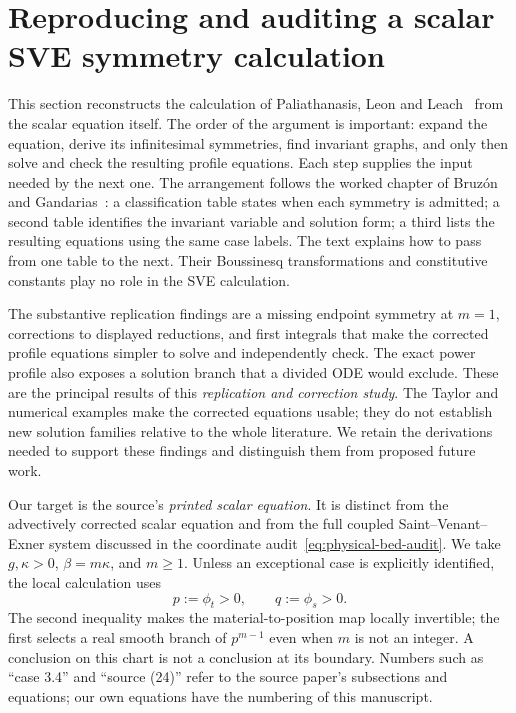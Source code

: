 \documentclass[11pt]{article}
\theoremstyle{definition}
\begin{document}
\section{Reproducing and auditing a scalar SVE symmetry calculation}
\label{sec:sve-repro}
This section reconstructs the calculation of Paliathanasis, Leon and
Leach~\cite{ap} from the scalar equation itself. The order of the argument is
important: expand the equation, derive its infinitesimal symmetries, find
invariant graphs, and only then solve and check the resulting profile
equations. Each step supplies the input needed by the next one. The
arrangement follows the worked chapter of Bruz\'{o}n and
Gandarias~\cite[Sec.~2, Tables~1--3, pp.~157--159]{bruzon-gandarias-2021}:
a classification table states when each symmetry is admitted; a second
table identifies the invariant variable and solution form; a third lists
the resulting equations using the same case labels. The text explains how
to pass from one table to the next. Their Boussinesq transformations and
constitutive constants play no role in the SVE calculation.

The substantive replication findings are a missing endpoint symmetry at
$m=1$, corrections to displayed reductions, and first integrals that make
the corrected profile equations simpler to solve and independently check.
The exact power profile also exposes a solution branch that a divided ODE
would exclude. These are the principal results of this
\emph{replication and correction study}. The Taylor and numerical examples
make the corrected equations usable; they do not establish new solution
families relative to the whole literature. We retain the derivations needed
to support these findings and distinguish them from proposed future work.

Our target is the source's \emph{printed scalar equation}. It is distinct
from the advectively corrected scalar equation and from the full coupled
Saint--Venant--Exner system discussed in the coordinate audit~\eqref{eq:physical-bed-audit}.
We take $g,\kappa>0$, $\beta=m\kappa$, and $m\geq1$. Unless an exceptional
case is explicitly identified, the local calculation uses
\begin{equation}
 p:=\phi_t>0,\qquad q:=\phi_s>0.
 \label{eq:sve-repro-chart}
\end{equation}
The second inequality makes the material-to-position map locally invertible;
the first selects a real smooth branch of $p^{m-1}$ even when $m$ is not an
integer. A conclusion on this chart is not a conclusion at its boundary.
Numbers such as ``case 3.4'' and ``source (24)'' refer to the source paper's
subsections and equations; our own equations have the numbering of this manuscript.
\end{document}
